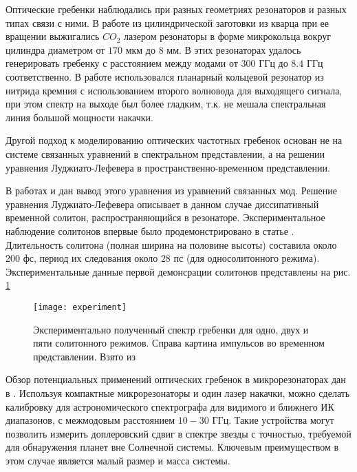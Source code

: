 Оптические гребенки наблюдались при разных геометриях резонаторов и разных типах связи с ними. В работе \cite{DelHaye2013} из цилиндрической заготовки из кварца при ее вращении выжигались $CO_2$ лазером резонаторы в форме микрокольца вокруг цилиндра диаметром от $170$ мкм до $8$ мм. В этих резонаторах удалось генерировать гребенку с расстоянием между модами от $300$ ГГц до $8.4$ ГГц соответственно. В работе \cite{Wang2013oe} использовался планарный кольцевой резонатор из нитрида кремния с использованием второго волновода для выходящего сигнала, при этом спектр на выходе был более гладким, т.к. не мешала спектральная линия большой мощности накачки.

Другой подход к моделированию оптических частотных гребенок основан не на системе связанных уравнений в спектральном представлении, а на решении уравнения Луджиато-Лефевера в пространственно-временном представлении.

В работах \cite{Matsko2011} и \cite{Chembo2013} дан вывод этого уравнения из уравнений связанных мод. Решение уравнения Луджиато-Лефевера описывает в данном случае диссипативный временной солитон, распространяющийся в резонаторе. Экспериментальное наблюдение солитонов впервые было продемонстрировано в статье \cite{Herr2014}. Длительность солитона (полная ширина на половине высоты) составила около $200$ фс, период их следования около $28$ пс (для односолитонного режима). Экспериментальные данные первой демонсрации солитонов представлены на рис. \ref{experiment}

\begin{figure}
  \texttt{[image: experiment]}
  \caption{Экспериментально полученный спектр гребенки для одно, двух и пяти солитонного режимов. Справа картина импульсов во временном представлении. Взято из \cite{Herr2014}} \label{experiment}
\end{figure}

Обзор потенциальных применений оптических гребенок в микрорезонаторах дан в \cite{Kippenberg2011}. Используя компактные микрорезонаторы и один лазер накачки, можно сделать калибровку для астрономического спектрографа для видимого и ближнего ИК диапазонов, с межмодовым расстоянием $10-30$ ГГц. Такие устройства могут позволить измерить доплеровский сдвиг в спектре звезды с точностью, требуемой для обнаружения планет вне Солнечной системы. Ключевым преимуществом в этом случае является малый размер и масса системы.

